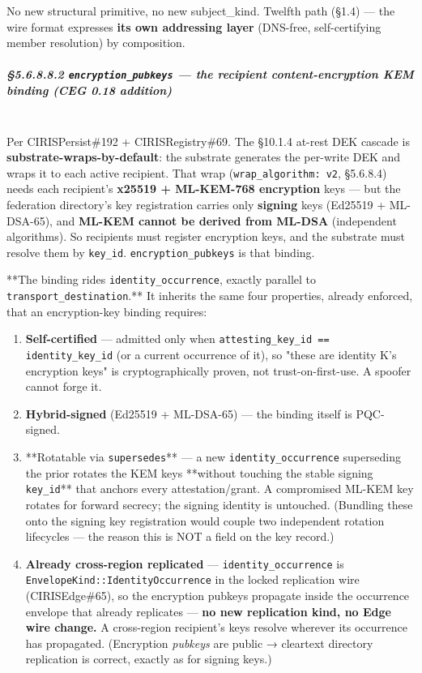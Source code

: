 \documentclass[11pt]{article}
\begin{document}
No new structural primitive, no new subject\_kind. Twelfth path (§1.4) — the wire format expresses \textbf{its own addressing layer} (DNS-free, self-certifying member resolution) by composition.


\subparagraph{§5.6.8.8.2 \texttt{encryption\_pubkeys} — the recipient content-encryption KEM binding (CEG 0.18 addition)}\mbox{}\\


Per CIRISPersist\#192 + CIRISRegistry\#69. The §10.1.4 at-rest DEK cascade is \textbf{substrate-wraps-by-default}: the substrate generates the per-write DEK and wraps it to each active recipient. That wrap (\texttt{wrap\_algorithm: v2}, §5.6.8.4) needs each recipient's \textbf{x25519 + ML-KEM-768 encryption} keys — but the federation directory's key registration carries only \textbf{signing} keys (Ed25519 + ML-DSA-65), and \textbf{ML-KEM cannot be derived from ML-DSA} (independent algorithms). So recipients must register encryption keys, and the substrate must resolve them by \texttt{key\_id}. \texttt{encryption\_pubkeys} is that binding.


**The binding rides \texttt{identity\_occurrence}, exactly parallel to \texttt{transport\_destination}.** It inherits the same four properties, already enforced, that an encryption-key binding requires:

\begin{enumerate}\setlength\itemsep{0pt}
\item \textbf{Self-certified} — admitted only when \texttt{attesting\_key\_id == identity\_key\_id} (or a current occurrence of it), so "these are identity K's encryption keys" is cryptographically proven, not trust-on-first-use. A spoofer cannot forge it.
\item \textbf{Hybrid-signed} (Ed25519 + ML-DSA-65) — the binding itself is PQC-signed.
\item **Rotatable via \texttt{supersedes}** — a new \texttt{identity\_occurrence} superseding the prior rotates the KEM keys **without touching the stable signing \texttt{key\_id}** that anchors every attestation/grant. A compromised ML-KEM key rotates for forward secrecy; the signing identity is untouched. (Bundling these onto the signing key registration would couple two independent rotation lifecycles — the reason this is NOT a field on the key record.)
\item \textbf{Already cross-region replicated} — \texttt{identity\_occurrence} is \texttt{EnvelopeKind::IdentityOccurrence} in the locked replication wire (CIRISEdge\#65), so the encryption pubkeys propagate inside the occurrence envelope that already replicates — \textbf{no new replication kind, no Edge wire change.} A cross-region recipient's keys resolve wherever its occurrence has propagated. (Encryption \textit{pubkeys} are public → cleartext directory replication is correct, exactly as for signing keys.)
\end{enumerate}
\end{document}
